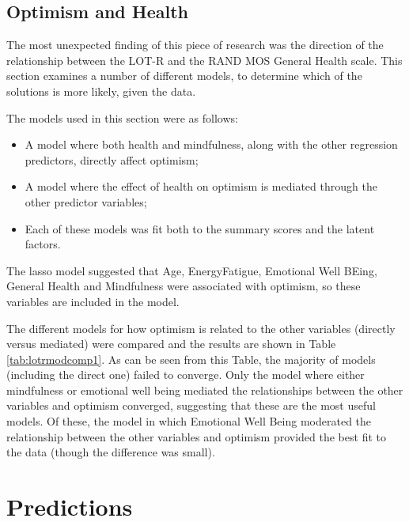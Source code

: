 \documentclass{article}
\begin{document}
\subsection{Optimism and Health}
\label{sec:optimism-health}

The most unexpected finding of this piece of research was the direction of the relationship between the LOT-R and the RAND MOS General Health scale. This section examines a number of different models, to determine which of the solutions is more likely, given the data. 

The models used in this section were as follows:

\begin{itemize}
\item A model where both health and mindfulness, along with the other regression predictors, directly affect optimism;

\item A model where the effect of health on optimism is mediated through the other predictor variables;

\item Each of these models was fit both to the summary scores and the latent factors.
\end{itemize}

The lasso model suggested that Age, EnergyFatigue, Emotional Well BEing, General Health and Mindfulness were associated with optimism, so these variables are included in the model. 












The different models for how optimism is related to the other variables (directly versus mediated) were compared and the results are shown in Table \ref{tab:lotrmodcomp1}. As can be seen from this Table, the majority of models (including the direct one) failed to converge. Only the model where either mindfulness or emotional well being mediated the relationships between the other variables and optimism converged, suggesting that these are the most useful models. Of these, the model in which Emotional Well Being moderated the relationship between the other variables and optimism provided the best fit to the data (though the difference was small). 


\section{Predictions}
\label{sec:predictions}
\end{document}
